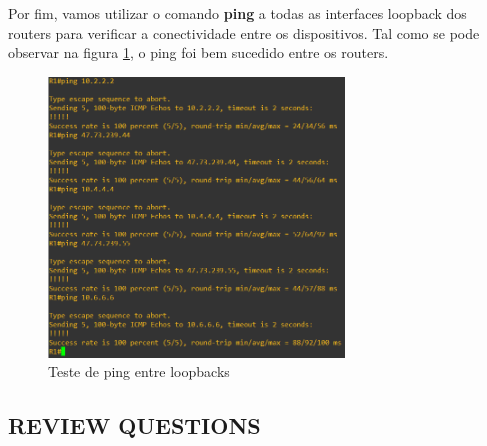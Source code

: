 \documentclass[11pt,english, openright, oneside]{book}
\begin{document}
\newpage
Por fim, vamos utilizar o comando \textbf{ping} a todas as interfaces loopback dos routers para verificar a conectividade entre os dispositivos. Tal como se pode observar na figura \ref{fig:pingLoopback}, o ping foi bem sucedido entre os routers.
\vspace{0.2cm}

\begin{figure}[H]
  \centering
  \includegraphics[width=0.70\textwidth]{imagens/Tarefa1/2.pingLoopback.png}
  \caption{Teste de ping entre loopbacks}
  \label{fig:pingLoopback}
\end{figure}
\vspace{0.2cm}

\subsection{REVIEW QUESTIONS}
\vspace{0.2cm}
\end{document}
